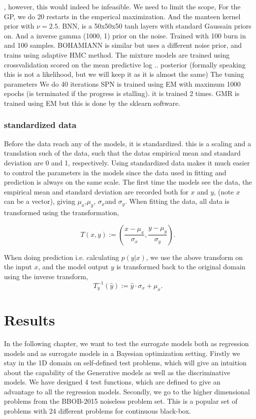 , however, this would indeed be infeasible. We need to limit the scope, 
For the GP, we do 20 restarts in the emperical maximization. And the manteen kernel prior
with $\nu = 2.5$. 
BNN, is a 50x50x50 tanh layers with standard Gaussain priors on. And a inverse gamma (1000, 1)
prior on the noise. Trained with 100 burn in and 100 samples. 
BOHAMIANN is similar but uses a different noise prior, and trains using adaptive HMC method. 
The mixture models are trained using crossvalidation scored on the mean predictive log .. posterior
(formally speaking this is not a likelihood, but we will keep it as it is almost the same)
The tuning parameters 
We do 40 iterations 
SPN is trained using EM with maximum 1000 epochs (is terminated if the progress is stalling). 
it is trained 2 times. 
GMR is trained using EM but this is done by the sklearn software. 

\subsection{standardized data}
Before the data reach any of the models, it is standardized. this is a scaling and a translation
such of the data, such that the datas empirical mean and standard deviation are 0 and 1,
respectively. Using standardized data makes it much easier to control the parameters in the models
since the data used in fitting and prediction is always on the same scale. The first time the models
see the data, the empirical mean and standard deviation are recorded both for $x$ and $y$, (note $x$
can be a vector), giving $\mu_x$,$\mu_y$, $\sigma_x$and $\sigma_y$. When fitting the data, all data
is transformed using the transformation, 

$$T(x,y) := \left(\frac{x-\mu_x}{\sigma_x}, \frac{y-\mu_y}{\sigma_y} \right).$$

When doing prediction i.e. calculating $p(y|x)$, we use the above transform on the input $x$, and
the model output $y$ is transformed back to the original domain using the inverse transform, 
$$T^{-1}_y(\hat y) :=\hat y \cdot \sigma_x+\mu_x.$$

 \chapter{Results}
 In the following chapter, we want to test the surrogate models both as regression models and as surrogate
 models in a Bayesian optimization setting. Firstly we stay in the 1D domain on self-defined test problems, 
 which will give an intuition about the capability of the Generative models as well as the discriminative models. 
We have designed 4 test functions, which are defined to give an advantage to all the regression models. Secondly, 
we go to the higher dimensional problems from the BBOB-2015 noiseless problem set. This is a popular set of problems 
with 24 different problems for continuous black-box.


